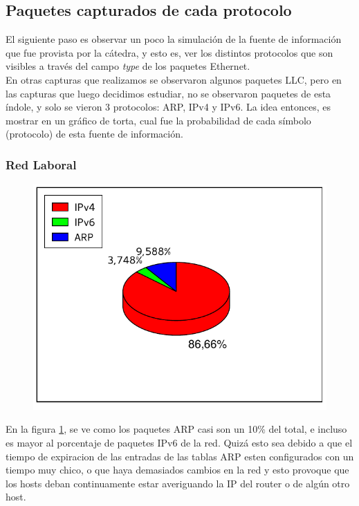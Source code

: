 \FloatBarrier
\subsection{Paquetes capturados de cada protocolo}

El siguiente paso es observar un poco la simulación de la fuente de información que fue provista por la cátedra, y esto es, ver los distintos protocolos que son visibles a través del campo \textit{type} de los paquetes Ethernet.\\

En otras capturas que realizamos se observaron algunos paquetes LLC, pero en las capturas que luego decidimos estudiar, no se observaron paquetes de esta índole, y solo se vieron 3 protocolos: ARP, IPv4 y IPv6. La idea entonces, es mostrar en un gráfico de torta, cual fue la probabilidad de cada símbolo (protocolo) de esta fuente de información.

\FloatBarrier
\subsubsection{Red Laboral}

\begin{figure}[h!]
  \begin{center}
    \includegraphics{graficos/protocolos-baufest.pdf}
	\caption{}
    \label{fig:proto-baufest}  
  \end{center}
\end{figure}

En la figura \ref{fig:proto-baufest}, se ve como los paquetes ARP casi son un 10\% del total, e incluso es mayor al porcentaje de paquetes IPv6 de la red. Quizá esto sea debido a que el tiempo de expiracion de las entradas de las tablas ARP esten configurados con un tiempo muy chico, o que haya demasiados cambios en la red y esto provoque que los hosts deban continuamente estar averiguando la IP del router o de algún otro host.


